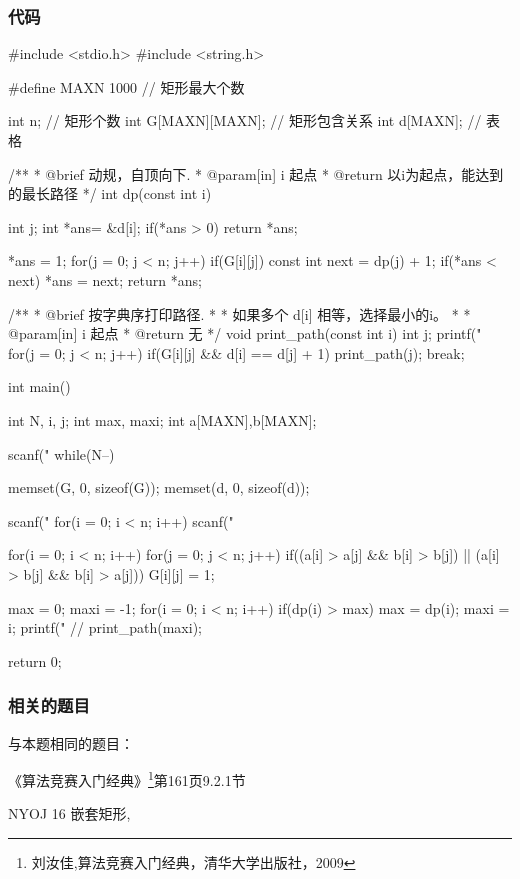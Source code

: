 \subsubsection{代码}
\begin{Codex}[label=embedded_rectangles.c]
#include <stdio.h>
#include <string.h>

#define MAXN 1000 // 矩形最大个数

int n; // 矩形个数
int G[MAXN][MAXN]; // 矩形包含关系
int d[MAXN]; // 表格

/**
 * @brief 动规，自顶向下.
 * @param[in] i 起点
 * @return 以i为起点，能达到的最长路径
 */
int dp(const int i) {
    int j;
    int *ans= &d[i];
    if(*ans > 0) return *ans;

    *ans = 1;
    for(j = 0; j < n; j++) if(G[i][j]) {
        const int next = dp(j) + 1;
        if(*ans < next) *ans = next;
    }
    return *ans;
}

/**
 * @brief 按字典序打印路径.
 *
 * 如果多个 d[i] 相等，选择最小的i。
 *
 * @param[in] i 起点
 * @return 无
 */
void print_path(const int i) {
    int j;
    printf("%
    for(j = 0; j < n; j++) if(G[i][j] && d[i] == d[j] + 1) {
        print_path(j);
        break;
    }
}

int main() {
    int N, i, j;
    int max, maxi;
    int a[MAXN],b[MAXN];

    scanf("%
    while(N--) {
        memset(G, 0, sizeof(G));
        memset(d, 0, sizeof(d));

        scanf("%
        for(i = 0; i < n; i++) scanf("%

        for(i = 0; i < n; i++)
            for(j = 0; j < n; j++)
                if((a[i] > a[j] && b[i] > b[j]) ||
                    (a[i] > b[j] && b[i] > a[j])) G[i][j] = 1;

        max = 0;
        maxi = -1;
        for(i = 0; i < n; i++) if(dp(i) > max) {
            max = dp(i);
            maxi = i;
        }
        printf("%
        // print_path(maxi);
    }
    return 0;
}
\end{Codex}

\subsubsection{相关的题目}
与本题相同的题目：
\begindot
\item 《算法竞赛入门经典》\footnote{刘汝佳,算法竞赛入门经典，清华大学出版社，2009}第161页9.2.1节
\item  NYOJ 16 嵌套矩形, 
\myenddot

